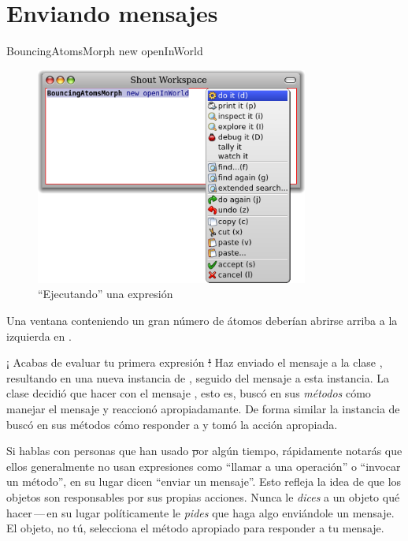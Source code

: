 \documentclass[a4paper,10pt,twoside]{book}
\begin{document}
\section{Enviando mensajes}


\begin{code}{}
BouncingAtomsMorph new openInWorld
\end{code}


\begin{figure}[htb]
\centerline {\includegraphics[width=0.8\textwidth]{Doit}}
\caption{``Ejecutando'' una expresi\'on}
\end{figure}

Una ventana conteniendo un gran n\'umero de \'atomos deber\'ian abrirse arriba a la izquierda en \pharo.

¡ Acabas de evaluar tu primera expresi\'on \st !
Haz enviado el mensaje  a la clase \bam, resultando en una nueva instancia de \bam, seguido del mensaje  a esta instancia.
La clase \bam decidi\'o que hacer con el mensaje , esto es, busc\'o en sus \emph{m\'etodos} c\'omo manejar el mensaje  y reaccion\'o apropiadamante.
De forma similar la instancia de \bam busc\'o en sus m\'etodos c\'omo responder a  y tom\'o la acci\'on apropiada.

Si hablas con personas que han usado \st por alg\'un tiempo, r\'apidamente notar\'as que ellos generalmente no usan expresiones como ``llamar a una operaci\'on'' o ``invocar un m\'etodo'', en su lugar dicen ``enviar un mensaje''.
Esto refleja la idea de que los objetos son responsables por sus propias acciones.
Nunca le \emph{dices} a un objeto qu\'e hacer\,---\,en su lugar pol\'iticamente le \emph{pides} que haga algo envi\'andole un mensaje.
El objeto, no t\'u, selecciona el m\'etodo apropiado para responder a tu mensaje.
\end{document}

